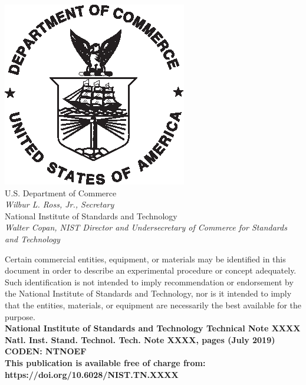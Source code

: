 \documentclass[12pt]{article}
\newcommand{\pubnumber}{XXXX}
\newcommand{\DOI}{https://doi.org/10.6028/NIST.TN.XXXX}
\newcommand{\monthyear}{July 2019}
\begin{document}
\begin{titlepage}
\begin{flushright}
\includegraphics[width=0.18\linewidth]{DoC-logo.eps}\\ 
\vfill
\footnotesize U.S. Department of Commerce\\
\textit{Wilbur L. Ross, Jr., Secretary}\\
\vspace{10pt}
National Institute of Standards and Technology\\
\textit{Walter Copan, NIST Director and Undersecretary of Commerce for Standards and Technology}
\end{flushright}
\end{titlepage}

\begin{titlepage}
\begin{flushright}
\footnotesize  Certain commercial entities, equipment, or materials may be identified in this document in order to describe an experimental procedure or concept adequately. Such identification is not intended to imply recommendation or endorsement by the National Institute of Standards and Technology, nor is it intended to imply that the entities, materials, or equipment are necessarily the best available for the purpose.\\ 
\vfill
\normalsize \textbf{National Institute of Standards and Technology Technical Note \pubnumber\\ 
Natl. Inst. Stand. Technol. Tech. Note \pubnumber, \pageref{LastPage} pages (\monthyear)} \\
\textbf{CODEN: NTNOEF}\\
\vspace{12pt}
\textbf{This publication is available free of charge from: \DOI}
\vfill
\end{flushright}
\end{titlepage}
\end{document}
